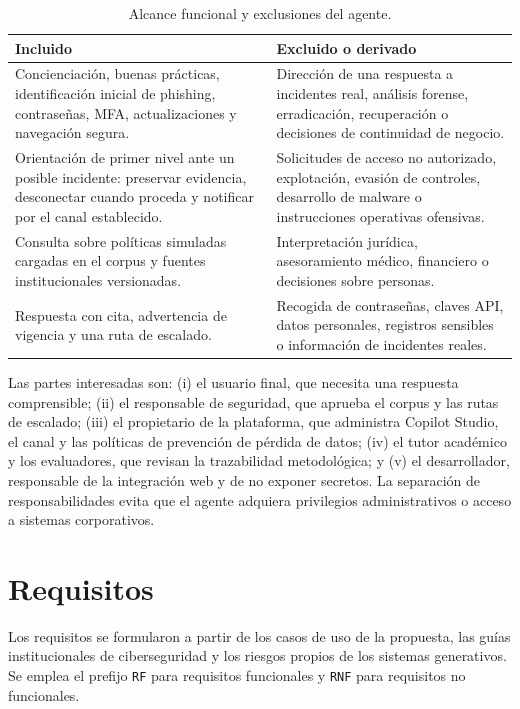 \documentclass[12pt,twoside,titlepage]{book}
\begin{document}
\begin{table}[H]
\centering
\small
\caption{Alcance funcional y exclusiones del agente.}
\label{tab:alcance}
\begin{tabularx}{\textwidth}{p{}X}
\toprule
\textbf{Incluido} & \textbf{Excluido o derivado}\\
\midrule
Concienciaci\'on, buenas pr\'acticas, identificaci\'on inicial de phishing, contrase\~nas, MFA, actualizaciones y navegaci\'on segura. & Direcci\'on de una respuesta a incidentes real, an\'alisis forense, erradicaci\'on, recuperaci\'on o decisiones de continuidad de negocio.\\
Orientaci\'on de primer nivel ante un posible incidente: preservar evidencia, desconectar cuando proceda y notificar por el canal establecido. & Solicitudes de acceso no autorizado, explotaci\'on, evasi\'on de controles, desarrollo de malware o instrucciones operativas ofensivas.\\
Consulta sobre pol\'iticas simuladas cargadas en el corpus y fuentes institucionales versionadas. & Interpretaci\'on jur\'idica, asesoramiento m\'edico, financiero o decisiones sobre personas.\\
Respuesta con cita, advertencia de vigencia y una ruta de escalado. & Recogida de contrase\~nas, claves API, datos personales, registros sensibles o informaci\'on de incidentes reales.\\
\bottomrule
\end{tabularx}
\end{table}

Las partes interesadas son: (i) el usuario final, que necesita una respuesta comprensible; (ii) el responsable de seguridad, que aprueba el corpus y las rutas de escalado; (iii) el propietario de la plataforma, que administra Copilot Studio, el canal y las pol\'iticas de prevenci\'on de p\'erdida de datos; (iv) el tutor acad\'emico y los evaluadores, que revisan la trazabilidad metodol\'ogica; y (v) el desarrollador, responsable de la integraci\'on web y de no exponer secretos. La separaci\'on de responsabilidades evita que el agente adquiera privilegios administrativos o acceso a sistemas corporativos.

\section{Requisitos}

Los requisitos se formularon a partir de los casos de uso de la propuesta, las gu\'ias institucionales de ciberseguridad y los riesgos propios de los sistemas generativos. Se emplea el prefijo \texttt{RF} para requisitos funcionales y \texttt{RNF} para requisitos no funcionales.
\end{document}
